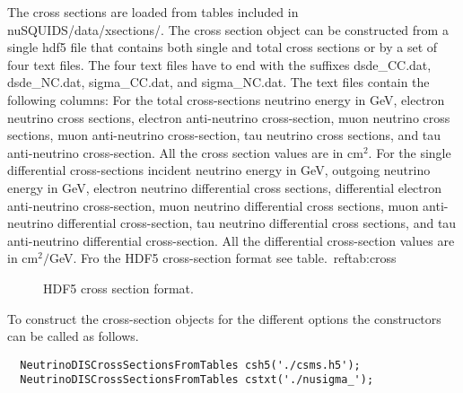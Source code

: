 The cross sections are loaded from tables included in
{\ttfamily nuSQUIDS/data/xsections/}.
The cross section object can be constructed from a single {\ttf hdf5}
file that contains both single and total cross sections or by a set of
four text files. The four text files have to end with the suffixes
{\ttf dsde\_CC.dat}, {\ttf dsde\_NC.dat}, {\ttf sigma\_CC.dat}, and
{\ttf sigma\_NC.dat}.
The text files contain the following columns:
For the total cross-sections neutrino energy in GeV, electron neutrino 
cross sections, electron anti-neutrino cross-section, muon neutrino
cross sections, muon anti-neutrino cross-section, tau neutrino
cross sections, and tau anti-neutrino cross-section. All the cross
section values are in cm$^2$.
For the single differential cross-sections incident neutrino energy in
GeV, outgoing neutrino energy in GeV, electron neutrino 
differential cross sections, differential electron anti-neutrino cross-section, muon neutrino
differential cross sections, muon anti-neutrino differential cross-section, tau neutrino
differential cross sections, and tau anti-neutrino differential
cross-section. All the differential cross-section values are in cm$^2/$GeV.
Fro the {\ttf HDF5} cross-section format see table.~ref{tab:cross}

\begin{figure}[htb]
  \label{cross}
  \centering
  \caption{HDF5 cross section format.}
  \label{fig:nusquids_cross_section_hdf5}
\end{figure}

To construct the cross-section objects for the different options the
constructors can be called as follows.

\begin{lstlisting}
  NeutrinoDISCrossSectionsFromTables csh5('./csms.h5');
  NeutrinoDISCrossSectionsFromTables cstxt('./nusigma_');
\end{lstlisting}

